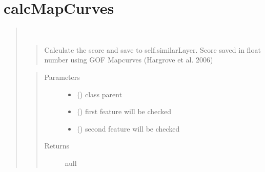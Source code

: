 \documentclass[letterpaper,10pt,english]{sphinxmanual}
\begin{document}
\section{calcMapCurves}
\label{\detokenize{similarity_method:calcmapcurves}}\begin{quote}

\begin{fulllineitems}
\label{\detokenize{similarity_method:calcMapCurves}}~\begin{quote}

Calculate the score and save to self.similarLayer. Score saved in float number using GOF Mapcurves (Hargrove et al. 2006)
\end{quote}
\begin{quote}\begin{description}
\item[{Parameters}] \leavevmode\begin{itemize}
\item {} 
 () \textendash{} class parent

\item {} 
 () \textendash{} first feature will be checked

\item {} 
 () \textendash{} second feature will be checked

\end{itemize}

\item[{Returns}] \leavevmode
null

\end{description}\end{quote}

\end{fulllineitems}

\end{quote}
\end{document}
